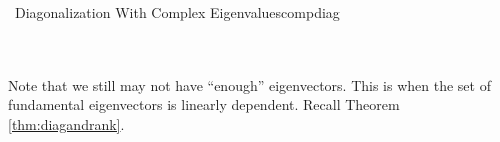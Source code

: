 \begin{example}{\Difficulty\,\Difficulty\,\,Diagonalization With Complex Eigenvalues}{compdiag}
        \end{example}
        \vphantom
        \\
        \\
        Note that we still may not have ``enough'' eigenvectors. This is when the set of fundamental eigenvectors is linearly dependent. Recall Theorem \ref{thm:diagandrank}.